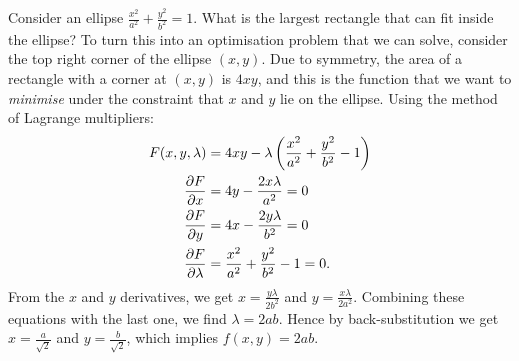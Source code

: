 \documentclass[../multivariate_calculus.tex]{subfiles}
\begin{document}
        \begin{example}
            Consider an ellipse $\frac{x^2}{a^2}+\frac{y^2}{b^2}=1$.
            What is the largest rectangle that can fit inside the ellipse?
            To turn this into an optimisation problem that we can solve, consider the top right corner of the ellipse $(x,y)$.
            Due to symmetry, the area of a rectangle with a corner at $(x,y)$ is $4xy$, and this is the function that we want to \textit{minimise} under the constraint that $x$ and $y$ lie on the ellipse.
            Using the method of Lagrange multipliers:
            \begin{align}
                F(x,y,\lambda)&=4xy-\lambda\left(\frac{x^2}{a^2}+\frac{y^2}{b^2}-1\right)\\
                \pdv{F}{x}&=4y-\frac{2x\lambda}{a^2}=0\\
                \pdv{F}{y}&=4x-\frac{2y\lambda}{b^2}=0\\
                \pdv{F}{\lambda}&=\frac{x^2}{a^2}+\frac{y^2}{b^2}-1=0.
            \end{align}
            From the $x$ and $y$ derivatives, we get $x=\frac{y\lambda}{2b^2}$ and $y=\frac{x\lambda}{2a^2}$.
            Combining these equations with the last one, we find $\lambda=2ab$.
            Hence by back-substitution we get $x=\frac{a}{\sqrt{2}}$ and $y=\frac{b}{\sqrt{2}}$, which implies $f(x,y)=2ab$.
        \end{example}
\end{document}
